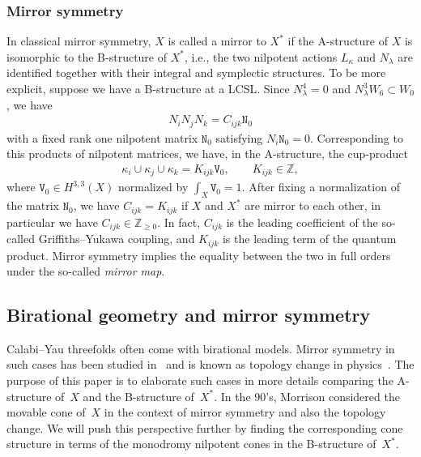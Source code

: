 \documentclass[10pt,a4paper]{amsart}
\numberwithin{equation}{section}
\begin{document}
\subsubsection{Mirror symmetry} In classical mirror symmetry, $X$ is called a mirror to $X^{*}$ if the A-structure of $X$ is isomorphic to the
B-structure of $X^{*}$, i.e., the two nilpotent actions $L_{\kappa}$ and $N_{\lambda}$ are identified together with their integral and symplectic structures. To be more explicit, suppose we have a B-structure at a LCSL. Since $N_{\lambda}^{4}=0$ and $N_{\lambda}^{3}W_{6}\subset W_{0}$, we have
\begin{gather*}
N_{i}N_{j}N_{k}=C_{ijk}\mathtt{N}_{0}%
\end{gather*}
with a fixed rank one nilpotent matrix $\mathtt{N}_{0}$ satisfying $N_{i}\mathtt{N}_{0}=0$. Corresponding to this products of nilpotent matrices, we have, in the A-structure, the cup-product
\begin{gather*}
\kappa_{i}\cup\kappa_{j}\cup\kappa_{k}=K_{ijk}\mathtt{V}_{0}, \qquad K_{ijk}\in\mathbb{Z},%
\end{gather*}
where $\mathtt{V}_{0}\in H^{3,3}(X)$ normalized by $\int_{X}\mathtt{V}_{0}=1$. After fixing a normalization of the matrix $\mathtt{N}_{0}$, we have $C_{ijk}=K_{ijk}$ if $X$ and $X^{*}$ are mirror to each other, in particular we have $C_{ijk}\in\mathbb{Z}_{\geq0}$. In fact, $C_{ijk}$ is the leading coefficient of the so-called Griffiths--Yukawa coupling, and $K_{ijk}$ is the leading term of the quantum product. Mirror symmetry implies the equality between the two in full orders under the so-called \textit{mirror map}.

\subsection{Birational geometry and mirror symmetry}

Calabi--Yau threefolds often come with birational models. Mirror symmetry in such cases has been studied in~\cite{MoKahler} and is known as topology change in physics~\cite{AGM}. The purpose of this paper is to elaborate such cases in more details comparing the A-structure of~$X$ and the B-structure of~$X^{*}$. In the 90's, Morrison considered the movable cone of~$X$ in the context of mirror symmetry and also the topology change. We will push this perspective further by finding the corresponding cone structure in terms of the monodromy nilpotent cones in the B-structure of~$X^{*}$.
\end{document}
